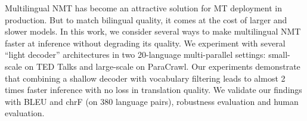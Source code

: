 Multilingual NMT has become an attractive solution for MT deployment in production. But to match bilingual quality, it comes at the cost of larger and slower models. In this work, we consider several ways to make multilingual NMT faster at inference without degrading its quality. We experiment with several ``light decoder'' architectures in two 20-language multi-parallel settings: small-scale on TED Talks and large-scale on ParaCrawl. Our experiments demonstrate that combining a shallow decoder with vocabulary filtering leads to almost 2 times faster inference with no loss in translation quality. We validate our findings with BLEU and chrF (on 380 language pairs), robustness evaluation and human evaluation.
